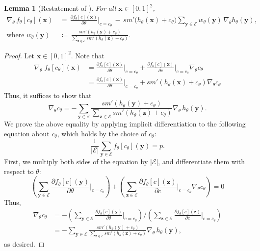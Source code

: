 \documentclass{article}
\theoremstyle{plain}
\newtheorem{lemma}{Lemma}[section]
\theoremstyle{definition}
\theoremstyle{remark}
\begin{document}
\begin{lemma}[Restatement of ]
For all $\mathbf{x} \in [0,1]^2$,
\begin{align*}
\nabla_\theta\, f_\theta[c_\theta](\mathbf{x})
\,&=\, \frac{\partial f_\theta[c](\mathbf{x})}{\partial \theta}\bigg|_{c = c_\theta}
\,-\, \mathit{sm}'\bigl(h_\theta(\mathbf{x}) + c_\theta\bigr)
\sum_{\mathbf{y} \in \mathcal{E}} w_\theta(\mathbf{y})\, \nabla_\theta h_\theta(\mathbf{y}),
\\
\text{where }
w_\theta(\mathbf{y}) \,&\coloneqq\, \frac{\mathit{sm}'(h_\theta(\mathbf{y}) + c_\theta)}{\sum_{\mathbf{z} \in \mathcal{E}} \mathit{sm}'(h_\theta(\mathbf{z}) + c_\theta)}.
\end{align*}
\end{lemma}
\begin{proof}[Proof]
Let $\mathbf{x} \in [0,1]^2$. Note that
\begin{align*}
    \nabla_\theta\;f_\theta[c_\theta](\mathbf{x}) 
    & = \frac{\partial f_\theta[c](\mathbf{x})}{\partial\theta}\Big|_{c = c_\theta} 
        + \frac{\partial f_\theta[c](\mathbf{x})}{\partial c}\Big|_{c = c_\theta} \nabla_\theta c_\theta
    \\
    & = \frac{\partial f_\theta[c](\mathbf{x})}{\partial\theta}\Big|_{c = c_\theta} 
        + \mathit{sm}'(h_\theta(\mathbf{x}) + c_\theta) \nabla_\theta c_\theta
\end{align*}
Thus, it suffices to show that 
\[
\nabla_\theta c_\theta = 
 {-}  \sum_{\mathbf{y} \in \mathcal{E}}\frac{\mathit{sm}'(h_\theta(\mathbf{y}) + c_\theta)}{\sum_{\mathbf{z} \in \mathcal{E}} \mathit{sm}'(h_\theta(\mathbf{z}) + c_\theta)} \nabla_\theta\, h_\theta(\mathbf{y}).
\]
We prove the above equality by applying implicit differentiation to the following equation about $c_\theta$, which holds by the choice of $c_\theta$:
\[
\frac{1}{|\mathcal{E}|} \sum_{\mathbf{y} \in \mathcal{E}} f_{\theta}[c_\theta](\mathbf{y}) = p.
\]
First, we multiply both sides of the equation by $|\mathcal{E}|$, and differentiate them with respect to $\theta$:
\[ 
\left(\sum_{\mathbf{y} \in \mathcal{E}} \frac{\partial f_{\theta}[c](\mathbf{y})}{\partial \theta}\Big|_{c = c_\theta}\right) 
+ 
\left(\sum_{\mathbf{z} \in \mathcal{E}} \frac{\partial f_{\theta}[c](\mathbf{z})}{\partial c}\Big|_{c = c_\theta} \nabla_\theta c_\theta\right) 
= 0
\]
Thus, 
\begin{align*}
    \nabla_\theta c_\theta 
    & {} = {-} \left(\sum_{\mathbf{y} \in \mathcal{E}} \frac{\partial f_{\theta}[c](\mathbf{y})}{\partial \theta}\Big|_{c = c_\theta}\right) \Bigg/  \left(\sum_{\mathbf{z} \in \mathcal{E}} \frac{\partial f_{\theta}[c](\mathbf{z})}{\partial c}\Big|_{c = c_\theta}\right)
    \\
    & =  {-} \sum_{\mathbf{y} \in \mathcal{E}} \frac{\mathit{sm}'(h_\theta(\mathbf{y}) + c_\theta)}{\sum_{\mathbf{z} \in \mathcal{E}} \mathit{sm}'(h_\theta(\mathbf{z}) + c_\theta)} \nabla_\theta\, h_\theta(\mathbf{y}),
\end{align*}  
as desired.
\end{proof}
\end{document}
